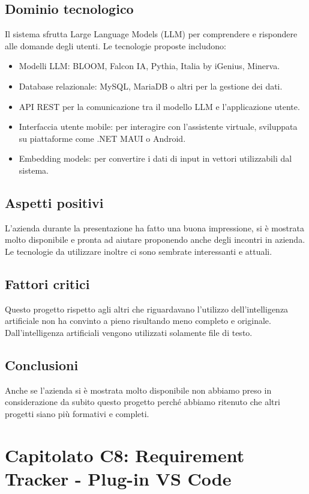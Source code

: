 \documentclass[italian, 12pt]{article}
\begin{document}
\subsection{Dominio tecnologico}
Il sistema sfrutta Large Language Models (LLM) per comprendere e rispondere alle domande degli utenti. Le tecnologie proposte includono:
\begin{itemize}
\item Modelli LLM: BLOOM, Falcon IA, Pythia, Italia by iGenius, Minerva.
\item Database relazionale: MySQL, MariaDB o altri per la gestione dei dati.
\item API REST per la comunicazione tra il modello LLM e l'applicazione utente.
\item Interfaccia utente mobile: per interagire con l'assistente virtuale, sviluppata su piattaforme come .NET MAUI o Android.
\item Embedding models: per convertire i dati di input in vettori utilizzabili dal sistema.
\end{itemize}

\subsection{Aspetti positivi}
L'azienda durante la presentazione ha fatto una buona impressione, si è mostrata molto disponibile e pronta ad aiutare proponendo anche degli incontri in azienda. Le tecnologie da utilizzare inoltre ci sono sembrate interessanti e attuali.

\subsection{Fattori critici}
Questo progetto rispetto agli altri che riguardavano l'utilizzo dell'intelligenza artificiale non ha convinto a pieno risultando meno completo e originale. Dall'intelligenza artificiali vengono utilizzati solamente file di testo.

\subsection{Conclusioni}
Anche se l'azienda si è mostrata molto disponibile non abbiamo preso in considerazione da subito questo progetto perché abbiamo ritenuto che altri progetti siano più formativi e completi.

\section{Capitolato C8: Requirement Tracker - Plug-in VS Code}
\end{document}
